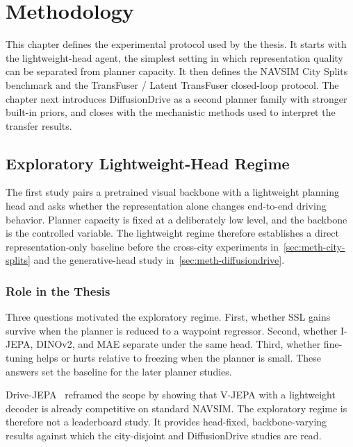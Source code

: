 \chapter{Methodology}
\label{chap:methodology}

This chapter defines the experimental protocol used by the thesis. It starts with the lightweight-head agent, the simplest setting in which representation quality can be separated from planner capacity. It then defines the NAVSIM City Splits benchmark and the TransFuser / Latent TransFuser closed-loop protocol. The chapter next introduces DiffusionDrive as a second planner family with stronger built-in priors, and closes with the mechanistic methods used to interpret the transfer results.

\section{Exploratory Lightweight-Head Regime}
\label{sec:meth-lightweight-head}

The first study pairs a pretrained visual backbone with a lightweight planning head and asks whether the representation alone changes end-to-end driving behavior. Planner capacity is fixed at a deliberately low level, and the backbone is the controlled variable. The lightweight regime therefore establishes a direct representation-only baseline before the cross-city experiments in~\ref{sec:meth-city-splits} and the generative-head study in~\ref{sec:meth-diffusiondrive}.

\subsection{Role in the Thesis}
\label{sec:meth-lh-role}

Three questions motivated the exploratory regime. First, whether SSL gains survive when the planner is reduced to a waypoint regressor. Second, whether I-JEPA, DINOv2, and MAE separate under the same head. Third, whether fine-tuning helps or hurts relative to freezing when the planner is small. These answers set the baseline for the later planner studies.

Drive-JEPA~\cite{wang-drive-jepa} reframed the scope by showing that V-JEPA with a lightweight decoder is already competitive on standard NAVSIM. The exploratory regime is therefore not a leaderboard study. It provides head-fixed, backbone-varying results against which the city-disjoint and DiffusionDrive studies are read.

